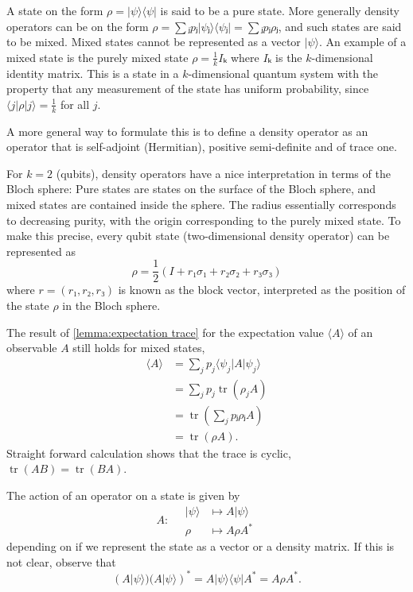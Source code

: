 A state on the form $ρ = |ψ⟩⟨ψ|$ is said to be a pure state. More generally density operators can be on the form $ρ = ∑ⱼ pⱼ |ψⱼ⟩⟨ψⱼ|= ∑ⱼ pⱼρⱼ$, and such states are said to be mixed. Mixed states cannot be represented as a vector $|ψ⟩$. An example of a mixed state is the purely mixed state $ρ = \frac{1}{k} Iₖ$ where $Iₖ$ is the $k$-dimensional identity matrix. This is a state in a $k$-dimensional quantum system with the property that any measurement of the state has uniform probability, since $⟨j|ρ|j⟩ = \frac{1}{k}$ for all $j$.

A more general way to formulate this is to define a density operator as an operator that is self-adjoint (Hermitian), positive semi-definite and of trace one.

For $k = 2$ (qubits), density operators have a nice interpretation in terms of the Bloch sphere: Pure states are states on the surface of the Bloch sphere, and mixed states are contained inside the sphere. The radius essentially corresponds to decreasing purity, with the origin corresponding to the purely mixed state. To make this precise, every qubit state (two-dimensional density operator) can be represented as
\begin{equation}
  ρ = \frac{1}{2}\left( I + r₁σ₁ + r₂σ₂ + r₃σ₃ \right)
\end{equation}
where $r = (r₁,r₂,r₃)$ is known as the block vector, interpreted as the position of the state $ρ$ in the Bloch sphere.

The result of \cref{lemma:expectation trace} for the expectation value $⟨A⟩$ of an observable $A$ still holds for mixed states,
\begin{equation}
  \begin{aligned}
    ⟨A⟩
    &= \sum_j p_j ⟨ψ_j|A|ψ_j⟩ \\
    &= \sum_j p_j \operatorname{tr}(ρ_j A) \\
    &= \operatorname{tr}\left(\sum_j pⱼ ρⱼ A \right) \\
    &= \operatorname{tr}\left( ρ A \right).
  \end{aligned}
\end{equation}
Straight forward calculation shows that the trace is cyclic, $\operatorname{tr}(AB) = \operatorname{tr}(BA)$.

The action of an operator on a state is given by
\begin{equation}
  A : \quad
  \begin{aligned}
    |ψ⟩ &↦ A|ψ⟩ \\
    ρ &↦ Aρ A^*
  \end{aligned}
\end{equation}
depending on if we represent the state as a vector or a density matrix. If this is not clear, observe that
\begin{equation}
  (A|ψ⟩) (A|ψ⟩)^* = A|ψ⟩⟨ψ|A^* = A ρ A^*.
\end{equation}

